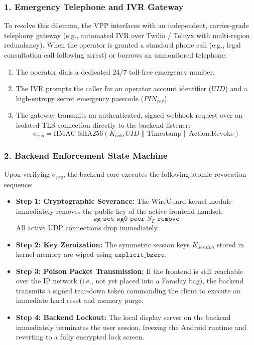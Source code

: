 \subsubsection{1. Emergency Telephone and IVR Gateway}
To resolve this dilemma, the VPP interfaces with an independent, carrier-grade telephony gateway (e.g., automated IVR over Twilio / Telnyx with multi-region redundancy). When the operator is granted a standard phone call (e.g., legal consultation call following arrest) or borrows an unmonitored telephone:
\begin{enumerate}
    \item The operator dials a dedicated 24/7 toll-free emergency number.
    \item The IVR prompts the caller for an operator account identifier ($UID$) and a high-entropy secret emergency passcode ($PIN_{rev}$).
    \item The gateway transmits an authenticated, signed webhook request over an isolated TLS connection directly to the backend listener:
    \begin{equation}
        \sigma_{req} = \text{HMAC-SHA256}(K_{oob}, UID \parallel \text{Timestamp} \parallel \text{Action:Revoke})
    \end{equation}
\end{enumerate}

\subsubsection{2. Backend Enforcement State Machine}
Upon verifying $\sigma_{req}$, the backend core executes the following atomic revocation sequence:
\begin{itemize}
    \item \textbf{Step 1: Cryptographic Severance:} The WireGuard kernel module immediately removes the public key of the active frontend handset:
    \begin{equation}
        \texttt{wg set wg0 peer } S_F \texttt{ remove}
    \end{equation}
    All active UDP connections drop immediately.
    \item \textbf{Step 2: Key Zeroization:} The symmetric session keys $K_{session}$ stored in kernel memory are wiped using $\texttt{explicit\_bzero}$.
    \item \textbf{Step 3: Poison Packet Transmission:} If the frontend is still reachable over the IP network (i.e., not yet placed into a Faraday bag), the backend transmits a signed tear-down token commanding the client to execute an immediate hard reset and memory purge.
    \item \textbf{Step 4: Backend Lockout:} The local display server on the backend immediately terminates the user session, freezing the Android runtime and reverting to a fully encrypted lock screen.
\end{itemize}

